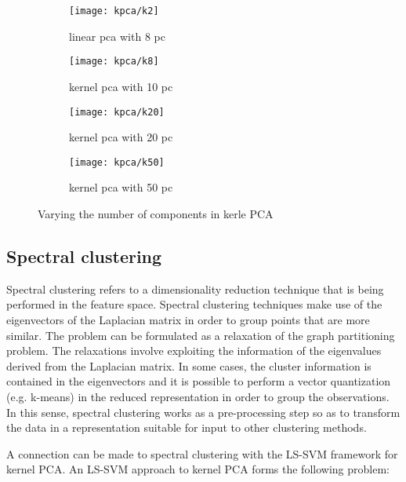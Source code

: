 \documentclass[conference,compsoc]{IEEEtran}
\begin{document}
\begin{figure*}[]
        \begin{subfigure}{0.45\linewidth}
            \texttt{[image: kpca/k2]}
            \caption{linear pca with 8 pc}
        \end{subfigure}
                \begin{subfigure}{0.45\linewidth}
            \texttt{[image: kpca/k8]}
            \caption{kernel pca with 10 pc}
        \end{subfigure}
          \begin{subfigure}{0.45\linewidth}
            \texttt{[image: kpca/k20]}
            \caption{kernel pca with 20 pc}
        \end{subfigure}
          \begin{subfigure}{0.45\linewidth}
            \texttt{[image: kpca/k50]}
            \caption{kernel pca with 50 pc}
        \end{subfigure}
                \centering
                    
\caption{Varying the number of components in kerle PCA}        
                     
        \label{fig:kpca2}
    \end{figure*}







\subsection{Spectral clustering}

Spectral clustering refers to a dimensionality reduction technique that is being performed in the feature space. Spectral clustering techniques make use of the eigenvectors of the Laplacian matrix in order to group points that are more similar. The problem can be formulated as a relaxation of the graph partitioning problem. The relaxations involve exploiting the information of the eigenvalues derived from the Laplacian matrix. In some cases, the cluster information is contained in the eigenvectors and it is possible to perform a vector quantization (e.g. k-means) in the reduced representation in order to group the observations. In this sense, spectral clustering works as a pre-processing step so as to transform the data in a representation suitable for input to other clustering methods. 

A connection can be made to spectral clustering with the LS-SVM framework for kernel PCA. An LS-SVM approach to kernel PCA forms the following problem:
\end{document}
